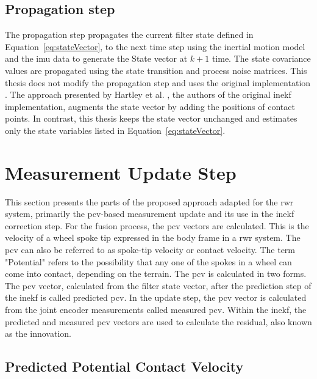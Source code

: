 \documentclass[report.tex]{subfiles}
\begin{document}
    \subsection{Propagation step}
    
    The propagation step propagates the current filter state defined in Equation~\ref{eq:stateVector}, to the next time step using the inertial motion model and the \gls{imu} data to generate the State vector at $k+1$ time. The state covariance values are propagated using the state transition and process noise matrices. This thesis does not modify the propagation step and uses the original implementation \cite{REPO-inekf-github}. The approach presented by Hartley et al. \cite{Hartley2018ContactAidedInEKF}, the authors of the original \gls{inekf} implementation, augments the state vector by adding the positions of contact points. In contrast, this thesis keeps the state vector unchanged and estimates only the state variables listed in Equation~\ref{eq:stateVector}.
    
    \section{Measurement Update Step}
    
    This section presents the parts of the proposed approach adapted for the \gls{rwr} system, primarily the \gls{pcv}-based measurement update and its use in the \gls{inekf} correction step. For the fusion process, the \gls{pcv} vectors are calculated. This is the velocity of a wheel spoke tip expressed in the body frame in a \gls{rwr} system. The \gls{pcv} can also be referred to as spoke-tip velocity or contact velocity. The term "Potential" refers to the possibility that any one of the spokes in a wheel can come into contact, depending on the terrain. The \gls{pcv} is calculated in two forms. The \gls{pcv} vector, calculated from the filter state vector, after the prediction step of the \gls{inekf} is called predicted \gls{pcv}. In the update step, the \gls{pcv} vector is calculated from the joint encoder measurements called measured \gls{pcv}. Within the \gls{inekf}, the predicted and measured \gls{pcv} vectors are used to calculate the residual, also known as the innovation.
    
    \subsection{Predicted Potential Contact Velocity} \label{subsec:predictedPCV}
    
\end{document}
